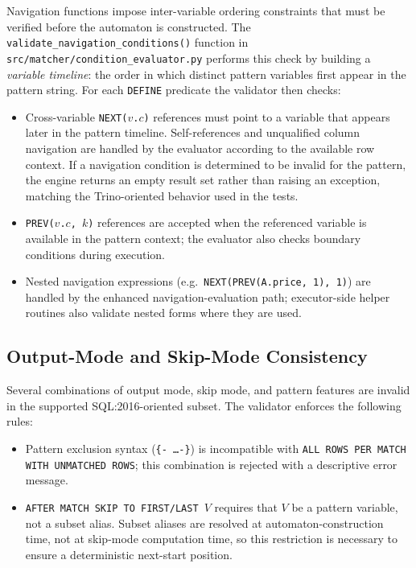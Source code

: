 Navigation functions impose inter-variable ordering constraints that
must be verified before the automaton is constructed.  The
\texttt{validate\_navigation\_conditions()} function in
\texttt{src/matcher/condition\_evaluator.py} performs this check by
building a \emph{variable timeline}: the order in which distinct
pattern variables first appear in the pattern string.  For each
\texttt{DEFINE} predicate the validator then checks:

\begin{itemize}
  \item Cross-variable \texttt{NEXT($v$.$c$)} references must point
    to a variable that appears later in the pattern timeline.
    Self-references and unqualified column navigation are handled by
    the evaluator according to the available row context.  If a
    navigation condition is determined to be invalid for the pattern,
    the engine returns an empty result set rather than raising an
    exception, matching the Trino-oriented behavior used in the
    tests.

  \item \texttt{PREV($v$.$c$, $k$)} references are accepted when
    the referenced variable is available in the pattern context; the
    evaluator also checks boundary conditions during execution.

  \item Nested navigation expressions (e.g.\
    \texttt{NEXT(PREV(A.price, 1), 1)}) are handled by the enhanced
    navigation-evaluation path; executor-side helper routines also
    validate nested forms where they are used.
\end{itemize}

\subsection{Output-Mode and Skip-Mode Consistency}
\label{subsec:sem-modes}

Several combinations of output mode, skip mode, and pattern
features are invalid in the supported SQL:2016-oriented subset.  The
validator enforces the following rules:

\begin{itemize}
  \item Pattern exclusion syntax (\texttt{\{- \ldots -\}}) is
    incompatible with \texttt{ALL ROWS PER MATCH WITH UNMATCHED
    ROWS}; this combination is rejected with a descriptive error
    message.

  \item \texttt{AFTER MATCH SKIP TO FIRST/LAST $V$} requires that
    $V$ be a pattern variable, not a subset alias.  Subset aliases
    are resolved at automaton-construction time, not at skip-mode
    computation time, so this restriction is necessary to ensure
    a deterministic next-start position.
\end{itemize}

